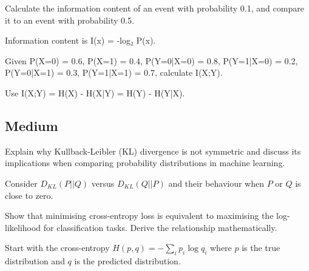 \begin{exercisebox}[easy]
\begin{problem}
Calculate the information content of an event with probability 0.1, and compare it to an event with probability 0.5.
\end{problem}
\begin{hintbox}
Information content is I(x) = -log₂ P(x).
\end{hintbox}
\end{exercisebox}


\begin{exercisebox}[easy]
\begin{problem}
Given P(X=0) = 0.6, P(X=1) = 0.4, P(Y=0|X=0) = 0.8, P(Y=1|X=0) = 0.2, P(Y=0|X=1) = 0.3, P(Y=1|X=1) = 0.7, calculate I(X;Y).
\end{problem}
\begin{hintbox}
Use I(X;Y) = H(X) - H(X|Y) = H(Y) - H(Y|X).
\end{hintbox}
\end{exercisebox}


\subsection*{Medium}

\begin{exercisebox}[medium]
\begin{problem}
Explain why Kullback-Leibler (KL) divergence is not symmetric and discuss its implications when comparing probability distributions in machine learning.
\end{problem}
\begin{hintbox}
Consider $D_{KL}(P||Q)$ versus $D_{KL}(Q||P)$ and their behaviour when $P$ or $Q$ is close to zero.
\end{hintbox}
\end{exercisebox}


\begin{exercisebox}[medium]
\begin{problem}
Show that minimising cross-entropy loss is equivalent to maximising the log-likelihood for classification tasks. Derive the relationship mathematically.
\end{problem}
\begin{hintbox}
Start with the cross-entropy $H(p,q) = -\sum_i p_i \log q_i$ where $p$ is the true distribution and $q$ is the predicted distribution.
\end{hintbox}
\end{exercisebox}


